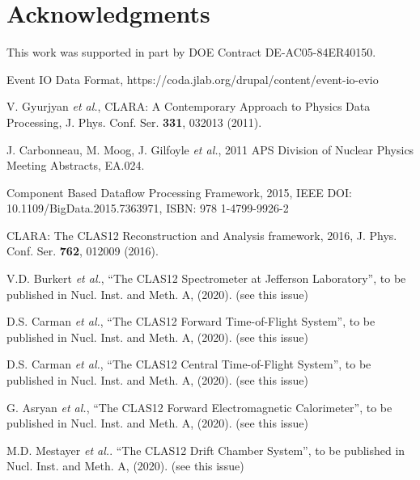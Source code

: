\documentclass[3p,times,twocolumn]{elsarticle}
\begin{document}
\tableofcontents



















\section{Acknowledgments}

This work was supported in part by DOE Contract DE-AC05-84ER40150.

\begin{thebibliography}{99}

Event IO Data Format,
https://coda.jlab.org/drupal/content/event-io-evio

V. Gyurjyan {\it et al.}, CLARA: A Contemporary Approach to Physics Data Processing, J. Phys. Conf. Ser.
{\bf 331}, 032013 (2011).

J. Carbonneau, M. Moog,  J. Gilfoyle {\it et al.}, 2011 APS Division of Nuclear Physics Meeting Abstracts, EA.024.

Component Based Dataflow Processing Framework, 2015, IEEE DOI: 10.1109/BigData.2015.7363971,
ISBN: 978 1-4799-9926-2

CLARA: The CLAS12 Reconstruction and Analysis framework, 2016, J. Phys. Conf. Ser. {\bf 762}, 012009 (2016).

V.D. Burkert {\it et al.}, ``The CLAS12 Spectrometer at Jefferson Laboratory'', to be published in Nucl.
Inst. and Meth. A, (2020). (see this issue)

D.S. Carman {\it et al.},   ``The CLAS12 Forward Time-of-Flight System'', to be published in Nucl.
Inst. and Meth. A, (2020). (see this issue)

D.S. Carman {\it et al.}, ``The CLAS12 Central Time-of-Flight System'', to be published in Nucl.
Inst. and Meth. A, (2020). (see this issue)

G. Asryan {\it et al.}, ``The CLAS12 Forward Electromagnetic Calorimeter'', to be published in Nucl.
Inst. and Meth. A, (2020). (see this issue)

M.D. Mestayer {\it et al.}. ``The CLAS12 Drift Chamber System'', to be published in Nucl. Inst. and
Meth. A, (2020). (see this issue)


\end{thebibliography}
\end{document}
